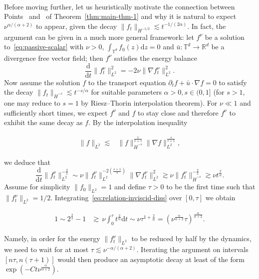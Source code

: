 \documentclass[11pt,oneside,reqno]{amsart}
\newcommand{\mathd}{\mathrm{d}}
\newcommand{\tmtextit}[1]{\text{{\itshape{#1}}}}
\numberwithin{equation}{section}
\begin{document}
\

Before moving further, let us heuristically motivate the connection between
Points~\tmtextit{i.} and~\tmtextit{ii.} of Theorem~\ref{thm:main-thm-1} and
why it is natural to expect $\nu^{\alpha / (\alpha + 2)}$ to appear, given the
decay $\| f_t \|_{H^{- 1 / 2}} \lesssim t^{- 1 / (2 \alpha)}$. In fact, the
argument can be given in a much more general framework: let $f^{\nu}$ be a
solution to~\eqref{eq:passive-scalar} with $\nu > 0$, $\int_{\mathbb{T}^d} f_0
(z) \mathd z = 0$ and $\bar{u} : \mathbb{T}^d \rightarrow \mathbb{R}^d$ be a
divergence free vector field; then $f^{\nu}$ satisfies the energy balance
\[ \frac{\mathd}{\mathd t} \| f^{\nu}_t \|_{L^2}^2 = - 2 \nu \| \nabla
   f^{\nu}_t \|_{L^2}^2 . \]
Now assume the solution $f$ to the transport equation $\partial_t f + \bar{u}
\cdot \nabla f = 0$ to satisfy the decay $\| f_t \|_{\dot{H}^{- s}} \lesssim
t^{- s / \alpha}$ for suitable parameters $\alpha > 0, s \in
(0, 1]$ (for $s > 1$, one may reduce to $s = 1$ by Riesz--Thorin interpolation
theorem). For $\nu \ll 1$ and sufficiently short times, we expect $f^{\nu}$
and $f$ to stay close and therefore $f^{\nu}$ to exhibit the same decay as
$f$. By the interpolation inequality

\begin{align*}
  \| f \|_{L^2} \lesssim & \| f \|_{\dot{H}^{- s}}^{\frac{1}{1 + s}}  \|
  \nabla f \|_{L^2}^{\frac{s}{s + 1}},
\end{align*}

we deduce that
\begin{equation}
  \frac{\mathd}{\mathd t} \| f^{\nu}_t \|_{L^2}^{- \frac{2}{s}} \sim \nu \|
  f^{\nu}_t \|_{L^2}^{- 2 \left( \frac{s + 1}{s} \right)} \| \nabla f^{\nu}_t
  \|_{L^2}^2 \gtrsim \nu \| f^{\nu}_t \|_{\dot{H}^{- s}}^{-
  \frac{2}{s}} \gtrsim \nu t^{\frac{2}{\alpha}} .
  \label{eq:relation-inviscid-diss}
\end{equation}
Assume for simplicity $\| f_0 \|_{L^2} = 1$ and define $\tau > 0$ to be the
first time such that $\| f^{\nu}_t \|_{L^2} = 1 / 2$.
Integrating~\eqref{eq:relation-inviscid-diss} over $[0, \tau]$ we obtain

\begin{align*}
  1 \sim 2^{\frac{2}{s}} - 1 & \gtrsim \, \nu \int_0^{\tau}
  t^{\frac{2}{\alpha}} \mathd t \sim \nu \tau^{1 + \frac{2}{\alpha}} = \left(
  \nu^{\frac{\alpha}{\alpha + 2}} \tau \right)^{\frac{\alpha}{\alpha + 2}} .
\end{align*}

Namely, in order for the energy $\| f^{\nu}_t \|_{L^2}$ to be reduced by half
by the dynamics, we need to wait for at most $\tau \lesssim \nu^{- \alpha /
(\alpha + 2)}$. Iterating the argument on intervals $[n \tau, n (\tau + 1)]$
would then produce an asymptotic decay at least of the form $\exp (- C t
\nu^{\frac{\alpha}{\alpha + 2}})$.
\end{document}

